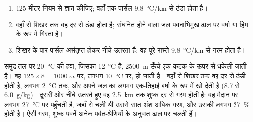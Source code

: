 \begin{method}\label{met:g10:why-clouds-form:mountain}
\begin{enumerate}
  \item 125-मीटर नियम से  ज्ञात कीजिए; वहाँ तक
        पार्सल \qty{9.8}{\degreeCelsius/km} से ठंडा होता है।
  \item वहाँ से शिखर तक वह  दर से ठंडा होता है; संघनित होने वाला जल
        पवनाभिमुख ढाल पर वर्षा या हिम के रूप में गिरता है।
  \item शिखर के पार पार्सल असंतृप्त होकर नीचे उतरता है: वह पूरे रास्ते
        \qty{9.8}{\degreeCelsius/km} से गरम होता है।
\end{enumerate}
\end{method}

\begin{example}\label{ex:g10:why-clouds-form:lee}
समुद्र तल पर \qty{20}{\degreeCelsius} की हवा, जिसका 
\qty{12}{\degreeCelsius} है, \qty{2500}{m} ऊँचे एक कटक के ऊपर से धकेली जाती है। वह
$125 \times 8 = \qty{1000}{m}$ पर, लगभग
\qty{10}{\degreeCelsius} पर,  हो जाती है। वहाँ से शिखर तक वह 
दर से ठंडी होती है, लगभग \qty{2}{\degreeCelsius} तक, और अपने जल का लगभग एक-तिहाई वर्षा
के रूप में खो देती है (\num{8.7} से \qty{6.0}{g/kg})। दूसरी ओर नीचे उतरते हुए
वह \qty{2.5}{km} तक शुष्क दर से गरम होती है: वह मैदान पर लगभग
\qty{27}{\degreeCelsius} पर पहुँचती है, जहाँ से चली थी उससे सात अंश अधिक गरम, और
उसकी  लगभग \qty{27}{\percent} होती है। ऐसी गरम, शुष्क पवनें
अनेक पर्वत-श्रेणियों के अनुवात ढाल पर चलती हैं।
\end{example}

